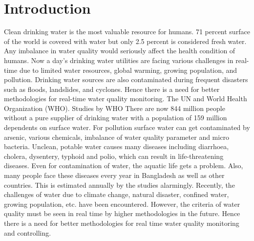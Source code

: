 \section{Introduction}
\label{intro}
Clean drinking water is the most valuable resource for humans. 71 percent surface of the world is covered with water but only 2.5 percent is considered fresh water. Any imbalance in water quality would seriously affect the health condition of humans. Now a day’s drinking water utilities are facing various challenges in real-time due to limited water resources, global warming, growing population, and pollution. Drinking water sources are also contaminated during frequent disasters such as floods, landslides, and cyclones. Hence there is a need for better methodologies for real-time water quality monitoring.
The UN and World Health Organization (WHO). Studies by WHO There are now 844 million people without a pure supplier of drinking water with a population of 159 million dependents on surface water. For pollution surface water can get contaminated by arsenic, various chemicals, imbalance of water quality parameter and micro bacteria. Unclean, potable water causes many diseases including diarrhoea, cholera, dysentery, typhoid and polio, which can result in life-threatening diseases. Even for contamination of water, the aquatic life gets a problem. Also, many people face these diseases every year in Bangladesh as well as other countries. This is estimated annually by the studies alarmingly. Recently, the challenges of water due to climate change, natural disaster, confined water, growing population, etc. have been encountered. However, the criteria of water quality must be seen in real time by higher methodologies in the future. Hence there is a need for better methodologies for real time water quality monitoring and controlling.


